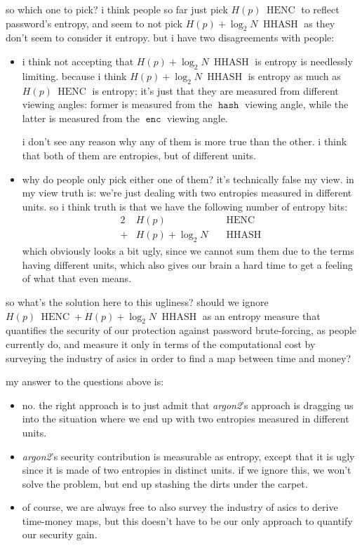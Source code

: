 \documentclass[twocolumn]{article}
\DeclareMathOperator{\enc}{\mathtt{enc}}
\DeclareMathOperator{\hash}{\mathtt{hash}}
\DeclareMathOperator{\henc}{\; HENC}
\DeclareMathOperator{\hhash}{\; HHASH}
\begin{document}
so which one to pick?  i think people so far just pick $H(p) \henc$ to
reflect password's entropy, and seem to not pick $H(p) + \log_2 N \hhash$
as they don't seem to consider it entropy.  but i have two disagreements
with people:
\begin{itemize}
    \item i think not accepting that $H(p) + \log_2 N \hhash$ is entropy is
    needlessly limiting.  because i think $H(p) + \log_2 N \hhash$ is
    entropy as much as $H(p) \henc$ is entropy; it's just that they are
    measured from different viewing angles:  former is measured from the
    $\hash$ viewing angle, while the latter is measured from the $\enc$
    viewing angle.

    i don't see any reason why any of them is more true than the other.  i
    think that both of them are entropies, but of different units.

    \item why do people only pick either one of them?  it's technically
    false my view.  in my view truth is:  we're just dealing with two
    entropies measured in different units.  so i think truth is that we
    have the following number of entropy bits:
    \begin{alignat*}{2}
            & H(p)              && \henc \\
        +{} & H(p) + \log_2 N   && \hhash 
    \end{alignat*}
    which obviously looks a bit ugly, since we cannot sum them due to the
    terms having different units, which also gives our brain a hard time to
    get a feeling of what that even means.
\end{itemize}

so what's the solution here to this ugliness?  should we ignore $H(p)\henc
+ H(p)+\log_2N\hhash$ as an entropy measure that quantifies the security of
our protection against password brute-forcing, as people currently do, and
measure it only in terms of the computational cost by surveying the
industry of asics in order to find a map between
time and money?

my answer to the questions above is:  
\begin{itemize}
    \item no.  the right approach is to just admit that \emph{argon2}'s
    approach is dragging us into the situation where we end up with two
    entropies measured in different units.
    \item \emph{argon2}'s security contribution is measurable as entropy,
    except that it is ugly since it is made of two entropies in distinct
    units.  if we ignore this, we won't solve the problem, but end up
    stashing the dirts under the carpet.
    \item of course, we are always free to also survey the industry of
    asics to derive time-money maps, but this doesn't have to be our only
    approach to quantify our security gain.
\end{itemize}
\end{document}
